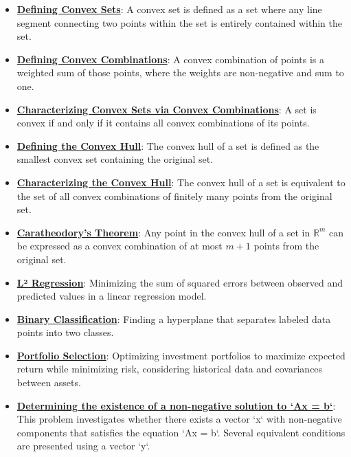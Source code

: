 \documentclass{article}%
\begin{document}
\begin{itemize}[leftmargin=*]
\item \href{https://www.math.purdue.edu/~yipn/421/2024-10-22-Convexity.pdf#page=1}{\textbf{Defining Convex Sets}}: A convex set is defined as a set where any line segment connecting two points within the set is entirely contained within the set.%
\item \href{https://www.math.purdue.edu/~yipn/421/2024-10-22-Convexity.pdf#page=1}{\textbf{Defining Convex Combinations}}: A convex combination of points is a weighted sum of those points, where the weights are non-negative and sum to one.%
\item \href{https://www.math.purdue.edu/~yipn/421/2024-10-22-Convexity.pdf#page=2}{\textbf{Characterizing Convex Sets via Convex Combinations}}: A set is convex if and only if it contains all convex combinations of its points.%
\item \href{https://www.math.purdue.edu/~yipn/421/2024-10-22-Convexity.pdf#page=5}{\textbf{Defining the Convex Hull}}: The convex hull of a set is defined as the smallest convex set containing the original set.%
\item \href{https://www.math.purdue.edu/~yipn/421/2024-10-22-Convexity.pdf#page=5}{\textbf{Characterizing the Convex Hull}}: The convex hull of a set is equivalent to the set of all convex combinations of finitely many points from the original set.%
\item \href{https://www.math.purdue.edu/~yipn/421/2024-10-22-Convexity.pdf#page=9}{\textbf{Caratheodory's Theorem}}: Any point in the convex hull of a set in $\mathbb{R}^m$ can be expressed as a convex combination of at most $m+1$ points from the original set.%
\item \href{https://www.math.purdue.edu/~yipn/421/2024-10-22-Regression.pdf#page=4}{\textbf{L² Regression}}: Minimizing the sum of squared errors between observed and predicted values in a linear regression model.%
\item \href{https://www.math.purdue.edu/~yipn/421/2024-10-22-Regression.pdf#page=7}{\textbf{Binary Classification}}: Finding a hyperplane that separates labeled data points into two classes.%
\item \href{https://www.math.purdue.edu/~yipn/421/2024-10-28-ApplsLinProg.pdf#page=9}{\textbf{Portfolio Selection}}: Optimizing investment portfolios to maximize expected return while minimizing risk, considering historical data and covariances between assets.%
\item \href{https://www.math.purdue.edu/~yipn/421/2024-10-28-Farkas.pdf#page=2}{\textbf{Determining the existence of a non{-}negative solution to `Ax = b`}}: This problem investigates whether there exists a vector `x` with non-negative components that satisfies the equation `Ax = b`. Several equivalent conditions are presented using a vector `y`.%

\end{itemize}
\end{document}

